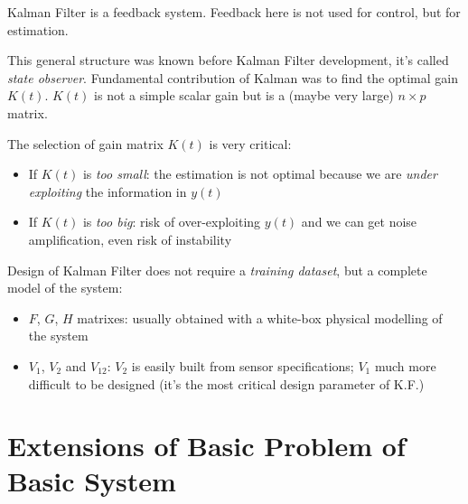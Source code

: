 Kalman Filter is a feedback system.
Feedback here is not used for control, but for estimation.

This general structure was known before Kalman Filter development, it's called \emph{state observer}.
Fundamental contribution of Kalman was to find the optimal gain $K(t)$.
$K(t)$ is not a simple scalar gain but is a (maybe very large) $n\times p$ matrix.

The selection of gain matrix $K(t)$ is very critical:
\begin{itemize}
    \item If $K(t)$ is \emph{too small}: the estimation is not optimal because we are \emph{under exploiting} the information in $y(t)$
    \item If $K(t)$ is \emph{too big}: risk of over-exploiting $y(t)$ and we can get noise amplification, even risk of instability
\end{itemize}

Design of Kalman Filter does not require a \emph{training dataset}, but a complete model of the system:
\begin{itemize}
    \item $F$, $G$, $H$ matrixes: usually obtained with a white-box physical modelling of the system
    \item $V_1$, $V_2$ and $V_{12}$: $V_2$ is easily built from sensor specifications; $V_1$ much more difficult to be designed (it's the most critical design parameter of K.F.)
\end{itemize}

\section{Extensions of Basic Problem of Basic System}

